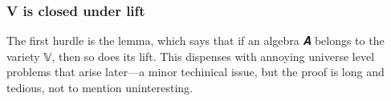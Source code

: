 \subsubsection{V is closed under lift}\label{v-is-closed-under-lift}
The first hurdle is the  lemma, which says that if an algebra \ab 𝑨 belongs to the variety 𝕍, then so does its lift. This dispenses with annoying universe level problems that arise later---a minor techinical issue, but the proof is long and tedious, not to mention uninteresting.
\ccpad
\begin{code}%
\>[0][@{}l@{\AgdaIndent{1}}]%
\>[1]\AgdaSpace{}%
\<%
\\
%
\>[1]\AgdaSpace{}%
\<%
\\
\>[1][@{}l@{\AgdaIndent{0}}]%
\>[2]\AgdaSpace{}%
\AgdaSymbol{:}\AgdaSpace{}%
\AgdaSymbol{\{}\AgdaSpace{}%
\AgdaSymbol{:}\AgdaSpace{}%
\AgdaSpace{}%
\AgdaSpace{}%
\AgdaSymbol{\}}\<%
\\
\>[2][@{}l@{\AgdaIndent{0}}]%
\>[3]%
\>[9]\AgdaSpace{}%
\AgdaSpace{}%
\AgdaSymbol{\{}\AgdaSymbol{\}\{}\AgdaSymbol{\}}\AgdaSpace{}%
\<%
\\
\>[3][@{}l@{\AgdaIndent{0}}]%
\>[7]\AgdaComment{---------------------------------}\<%
\\
%
\>[3]%
\>[8]\AgdaSpace{}%
\AgdaSpace{}%
\AgdaSpace{}%
\AgdaSpace{}%
\AgdaSymbol{\{}\AgdaSymbol{\}\{}\AgdaSymbol{\}}\AgdaSpace{}%
\<%
\\
%
\\[\AgdaEmptyExtraSkip]%
%
\>[1]\AgdaSpace{}%
\AgdaSymbol{(}\AgdaSymbol{\{}\AgdaSymbol{\}}\AgdaSpace{}%
\AgdaSymbol{)}\AgdaSpace{}%
\AgdaSymbol{=}\AgdaSpace{}%
\AgdaSpace{}%
\AgdaSymbol{(}\AgdaSymbol{\{}\AgdaSymbol{\}\{}\AgdaSpace{}%
\AgdaSymbol{=}\AgdaSpace{}%
\AgdaSymbol{\}}\AgdaSpace{}%
\AgdaSymbol{)}\AgdaSpace{}%
\AgdaSymbol{(}\AgdaSpace{}%
\AgdaSymbol{)}\<%
\\

\end{code}

